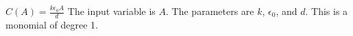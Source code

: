 {$C(A) = \frac{k \epsilon_0 A}{d}$}
{The input variable is $A$. The parameters are $k$, $\epsilon_0$, and $d$. This is a monomial of degree 1.}
